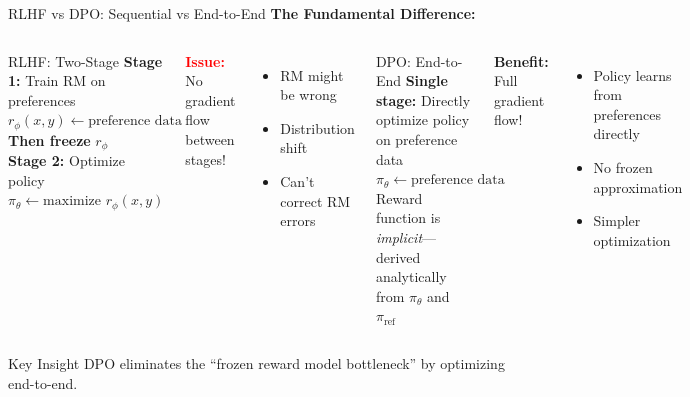 \documentclass[xcolor=svgnames, 10pt, handout]{beamer}
\begin{document}
\begin{frame}{RLHF vs DPO: Sequential vs End-to-End}
    \textbf{The Fundamental Difference:}
    \pause

    \begin{columns}[T]
    \begin{block}{RLHF: Two-Stage}
        \textbf{Stage 1:} Train RM on preferences
        $ r_\phi(x,y) \leftarrow \text{preference data} $
        \textbf{Then freeze} $r_\phi$ \\[0.3cm]
        \textbf{Stage 2:} Optimize policy
        $ \pi_\theta \leftarrow \text{maximize } r_\phi(x,y) $
    \end{block}
    \pause

    \textcolor{red}{\textbf{Issue:}} No gradient flow between stages!
    \begin{itemize}
        \item RM might be wrong
        \item Distribution shift
        \item Can't correct RM errors
    \end{itemize}

    \pause
    \begin{block}{DPO: End-to-End}
        \textbf{Single stage:} Directly optimize policy on preference data
        $ \pi_\theta \leftarrow \text{preference data} $
        \\[0.3cm]
        Reward function is \textit{implicit}---derived analytically from $\pi_\theta$ and $\pi_{\text{ref}}$
    \end{block}
    \pause

    \textcolor{green!50!black}{\textbf{Benefit:}} Full gradient flow!
    \begin{itemize}
        \item Policy learns from preferences directly
        \item No frozen approximation
        \item Simpler optimization
    \end{itemize}
    \end{columns}
    \pause

    \vspace{0.3cm}
    \begin{alertblock}{Key Insight}
        DPO eliminates the ``frozen reward model bottleneck'' by optimizing end-to-end.
    \end{alertblock}
\end{frame}
\end{document}
